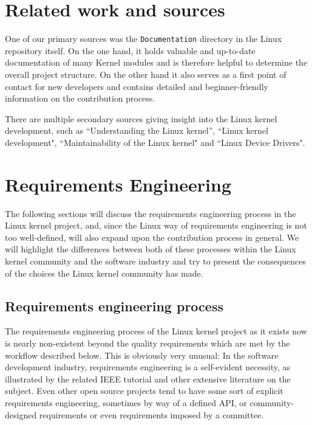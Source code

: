 \documentclass{sig-alternate-05-2015}
\begin{document}
\section{Related work and sources}

One of our primary sources was the \texttt{Documentation} directory in the Linux repository itself.
On the one hand, it holds valuable and up-to-date documentation of many Kernel modules and is therefore helpful to determine the overall project structure.
On the other hand it also serves as a first point of contact for new developers and contains detailed and beginner-friendly information on the contribution process.

There are multiple secondary sources giving insight into the Linux kernel development, such as ``Understanding the Linux kernel''\cite{bovet2005understanding}, ``Linux kernel development"\cite{love2010linux}, ``Maintainability of the Linux kernel"\cite{schach2002maintainability} and ``Linux Device Drivers"\cite{Corbet:2005:LDD:1209083}.


\section{Requirements Engineering}

The following sections will discuss the requirements engineering process in the Linux kernel project, and, since the Linux way of requirements engineering is not too well-defined, will also expand upon the contribution process in general.
We will highlight the differences between both of these processes within the Linux kernel community and the software industry and try to present the consequences of the choices the Linux kernel community has made.

\subsection{Requirements engineering process}

The requirements engineering process of the Linux kernel project as it exists now is nearly non-existent beyond the quality requirements which are met by the workflow described below.
This is obviously very unusual: In the software development industry, requirements engineering is a self-evident necessity, as illustrated by the related IEEE tutorial\cite{thayer1997software} and other extensive literature on the subject.
Even other open source projects tend to have some sort of explicit requirements engineering, sometimes by way of a defined API, or community-designed requirements or even requirements imposed by a committee.
\end{document}
